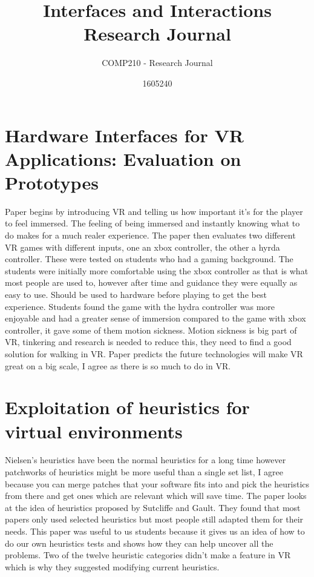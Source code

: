 \documentclass{scrartcl}
\title{Interfaces and Interactions Research Journal}
\subtitle{COMP210 - Research Journal}
\author{1605240}
\begin{document}
\maketitle

\section{Hardware Interfaces for VR Applications: Evaluation on Prototypes \cite{mentzelopoulos2015hardware}}
Paper begins by introducing VR and telling us how important it's for the player to feel immersed. The feeling of being immersed and instantly knowing what to do makes for a much realer experience. The paper then evaluates two different VR games with different inputs, one an xbox controller, the other a hyrda controller. These were tested on students who had a gaming background. The students were initially more comfortable using the xbox controller as that is what most people are used to, however after time and guidance they were equally as easy to use. Should be used to hardware before playing to get the best experience. Students found the game with the hydra controller was more enjoyable and had a greater sense of immersion compared to the game with xbox controller, it gave some of them motion sickness. Motion sickness is big part of VR, tinkering and research is needed to reduce this, they need to find a good solution for walking in VR. Paper predicts the future technologies will make VR great on a big scale, I agree as there is so much to do in VR.

\section{Exploitation of heuristics for virtual environments \cite{hvannberg2012exploitation}}
Nielsen's heuristics have been the normal heuristics for a long time however patchworks of heuristics might be more useful than a single set list, I agree because you can merge patches that your software fits into and pick the heuristics from there and get ones which are relevant which will save time. The paper looks at the idea of heuristics proposed by Sutcliffe and Gault. They found that most papers only used selected heuristics but most people still adapted them for their needs. This paper was useful to us students because it gives us an idea of how to do our own heuristics tests and shows how they can help uncover all the problems. Two of the twelve heuristic categories didn't make a feature in VR which is why they suggested modifying current heuristics.
\end{document}
